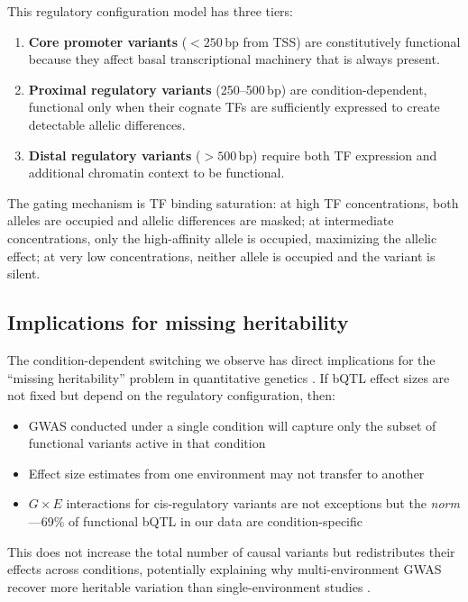 \documentclass[10pt,letterpaper]{article}
\begin{document}
This regulatory configuration model has three tiers:

\begin{enumerate}
  \item \textbf{Core promoter variants} ($< 250$\,bp from TSS) are
    constitutively functional because they affect basal transcriptional
    machinery that is always present.
  \item \textbf{Proximal regulatory variants} (250--500\,bp) are
    condition-dependent, functional only when their cognate TFs are
    sufficiently expressed to create detectable allelic differences.
  \item \textbf{Distal regulatory variants} ($> 500$\,bp) require both
    TF expression and additional chromatin context to be functional.
\end{enumerate}

The gating mechanism is TF binding saturation: at high TF concentrations,
both alleles are occupied and allelic differences are masked; at intermediate
concentrations, only the high-affinity allele is occupied, maximizing the
allelic effect; at very low concentrations, neither allele is occupied and
the variant is silent.

\subsection*{Implications for missing heritability}

The condition-dependent switching we observe has direct implications for the
``missing heritability'' problem in quantitative genetics
\cite{manolio2009}. If bQTL effect sizes are not fixed but depend on the
regulatory configuration, then:

\begin{itemize}
  \item GWAS conducted under a single condition will capture only the subset
    of functional variants active in that condition
  \item Effect size estimates from one environment may not transfer to another
  \item $G \times E$ interactions for cis-regulatory variants are not
    exceptions but the \emph{norm}---69\% of functional bQTL in our data are
    condition-specific
\end{itemize}

This does not increase the total number of causal variants but redistributes
their effects across conditions, potentially explaining why multi-environment
GWAS recover more heritable variation than single-environment studies
\cite{deng2022}.
\end{document}
